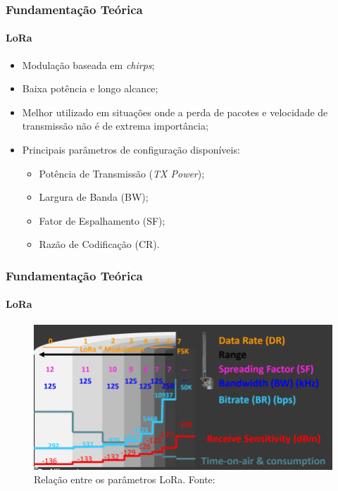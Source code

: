 \documentclass[aspectratio=169]{beamer}
\begin{document}
\begin{frame}

\frametitle{Fundamentação Teórica}
\framesubtitle{LoRa}

\begin{itemize}
    \item Modulação baseada em \emph{chirps};
    \item Baixa potência e longo alcance;
    \item Melhor utilizado em situações onde a perda de pacotes e velocidade de transmissão não é de extrema importância;
    \item Principais parâmetros de configuração disponíveis:
    \begin{itemize}
        \item Potência de Transmissão (\emph{TX Power});
        \item Largura de Banda (BW);
        \item Fator de Espalhamento (SF);
        \item Razão de Codificação (CR).
    \end{itemize}
    
\end{itemize}

\end{frame}

\begin{frame}

\frametitle{Fundamentação Teórica}
\framesubtitle{LoRa}

\begin{figure}
  \centering
  \includegraphics[scale=0.4]{img/Sens.png}
  \caption{Relação entre os parâmetros LoRa. Fonte: }
\end{figure}

\end{frame}
\end{document}
